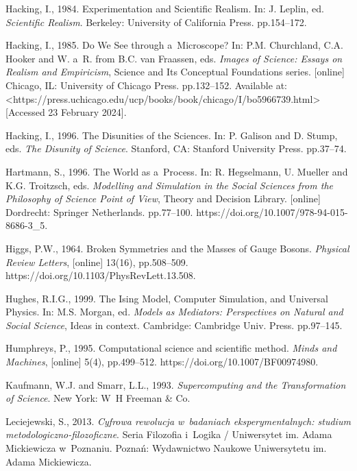 Hacking, I., 1984. Experimentation and Scientific Realism. In: J. Leplin, ed. \textit{Scientific Realism}. Berkeley: University of California Press. pp.154–172.



Hacking, I., 1985. Do We See through a~Microscope? In: P.M. Churchland, C.A. Hooker and W. a~R. from B.C. van Fraassen, eds. \textit{Images of Science: Essays on Realism and Empiricism}, Science and Its Conceptual Foundations series. [online] Chicago, IL: University of Chicago Press. pp.132–152. Available at: {\textless}https://press.uchicago.edu/ucp/books/book/chicago/I/bo5966739.html{\textgreater} [Accessed 23 February 2024].



Hacking, I., 1996. The Disunities of the Sciences. In: P. Galison and D. Stump, eds. \textit{The Disunity of Science}. Stanford, CA: Stanford University Press. pp.37–74.



Hartmann, S., 1996. The World as a~Process. In: R. Hegselmann, U. Mueller and K.G. Troitzsch, eds. \textit{Modelling and Simulation in the Social Sciences from the Philosophy of Science Point of View}, Theory and Decision Library. [online] Dordrecht: Springer Netherlands. pp.77–100. https://doi.org/10.1007/978-94-015-8686-3\_5.



Higgs, P.W., 1964. Broken Symmetries and the Masses of Gauge Bosons. \textit{Physical Review Letters}, [online] 13(16), pp.508–509. https://doi.org/10.1103/PhysRevLett.13.508.



Hughes, R.I.G., 1999. The Ising Model, Computer Simulation, and Universal Physics. In: M.S. Morgan, ed. \textit{Models as Mediators: Perspectives on Natural and Social Science}, Ideas in context. Cambridge: Cambridge Univ. Press. pp.97–145.



Humphreys, P., 1995. Computational science and scientific method. \textit{Minds and Machines}, [online] 5(4), pp.499–512. https://doi.org/10.1007/BF00974980.



Kaufmann, W.J. and Smarr, L.L., 1993. \textit{Supercomputing and the Transformation of Science}. New York: W~H Freeman \& Co.



Leciejewski, S., 2013. \textit{Cyfrowa rewolucja w~badaniach eksperymentalnych: studium metodologiczno-filozoficzne}. Seria Filozofia i~Logika / Uniwersytet im. Adama Mickiewicza w~Poznaniu. Poznań: Wydawnictwo Naukowe Uniwersytetu im. Adama Mickiewicza.



